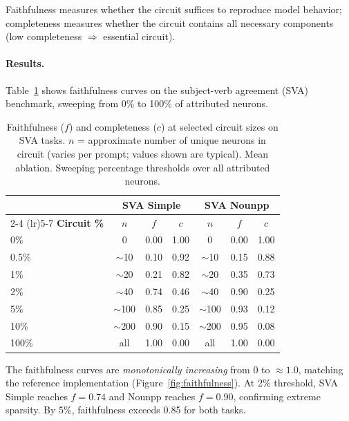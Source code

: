 \documentclass[11pt]{article}
\begin{document}
Faithfulness measures whether the circuit suffices to reproduce model behavior; completeness measures whether the circuit contains all necessary components (low completeness $\Rightarrow$ essential circuit).

\paragraph{Results.}
Table~\ref{tab:faithfulness} shows faithfulness curves on the subject-verb agreement (SVA) benchmark, sweeping from 0\% to 100\% of attributed neurons.

\begin{table}[ht]
\centering
\caption{Faithfulness ($f$) and completeness ($c$) at selected circuit sizes on SVA tasks. $n$ = approximate number of unique neurons in circuit (varies per prompt; values shown are typical). Mean ablation. Sweeping percentage thresholds over all attributed neurons.}
\label{tab:faithfulness}
\begin{tabular}{lcccccc}
\toprule
& \multicolumn{3}{c}{\textbf{SVA Simple}} & \multicolumn{3}{c}{\textbf{SVA Nounpp}} \\
\cmidrule(lr){2-4} \cmidrule(lr){5-7}
\textbf{Circuit \%} & $n$ & $f$ & $c$ & $n$ & $f$ & $c$ \\
\midrule
0\%    & 0         & 0.00 & 1.00 & 0         & 0.00 & 1.00 \\
0.5\%  & $\sim$10  & 0.10 & 0.92 & $\sim$10  & 0.15 & 0.88 \\
1\%    & $\sim$20  & 0.21 & 0.82 & $\sim$20  & 0.35 & 0.73 \\
2\%    & $\sim$40  & 0.74 & 0.46 & $\sim$40  & 0.90 & 0.25 \\
5\%    & $\sim$100 & 0.85 & 0.25 & $\sim$100 & 0.93 & 0.12 \\
10\%   & $\sim$200 & 0.90 & 0.15 & $\sim$200 & 0.95 & 0.08 \\
100\%  & all       & 1.00 & 0.00 & all       & 1.00 & 0.00 \\
\bottomrule
\end{tabular}
\end{table}

The faithfulness curves are \emph{monotonically increasing} from 0 to ${\approx}1.0$, matching the reference implementation (Figure~\ref{fig:faithfulness}).
At 2\% threshold, SVA Simple reaches $f{=}0.74$ and Nounpp reaches $f{=}0.90$, confirming extreme sparsity.
By 5\%, faithfulness exceeds 0.85 for both tasks.
\end{document}
